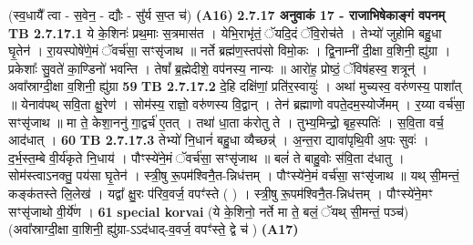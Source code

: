 \documentclass[17pt]{extarticle}
\begin{document}
{{                                    (स्व॒धायै᳚ त्वा - स॒वेन॒ - द्यौः - सु᳚र्य स॒प्त च॑) \textbf{(A16)} \newline \newline
                \textbf{ 2.7.17     अनुवाकं   17 - राजाभिषेकाङ्गं वपनम्} \newline
                                \textbf{ TB 2.7.17.1} \newline
                  ये के॒शिनः॑ प्रथ॒माः स॒त्रमास॑त । येभि॒राभृ॑तं॒ ॅयदि॒दं ॅवि॒रोच॑ते । तेभ्यो॑ जुहोमि बहु॒धा घृ॒तेन॑ । रा॒यस्पोषे॑णे॒मं ॅवर्च॑सा॒ सꣳसृ॑जाथ ॥ नर्ते ब्रह्म॑ण॒स्तप॑सो विमो॒कः । द्वि॒नाम्नी॑ दी॒क्षा व॒शिनी॒ ह्यु॑ग्रा । प्रकेशाः᳚ सु॒वते॑ का॒ण्डिनो॑ भवन्ति । तेषां᳚ ब्र॒ह्मेदीशे॒ वप॑नस्य॒ नान्यः ॥ आरो॑ह॒ प्रोष्ठं॒ ॅविष॑हस्व॒ शत्रून्॑ । अवा᳚स्राग्दी॒क्षा व॒शिनी॒ ह्यु॑ग्रा \textbf{ 59} \newline
                  \newline
                                \textbf{ TB 2.7.17.2} \newline
                  दे॒हि दक्षि॑णां॒ प्रति॑र॒स्वायुः॑ । अथा॑ मुच्यस्व॒ वरु॑णस्य॒ पाशा᳚त् ॥ येनाव॑पथ् सवि॒ता क्षु॒रेण॑ । सोम॑स्य॒ राज्ञो॒ वरु॑णस्य वि॒द्वान् । तेन॑ ब्रह्माणो वपते॒दम॒स्योर्जेमम् । र॒य्या वर्च॑सा॒ सꣳसृ॑जाथ ॥ मा ते॒ केशा॒ननु॑ गा॒द्वर्च॑ ए॒तत् । तथा॑ धा॒ता क॑रोतु ते । तुभ्य॒मिन्द्रो॒ बृह॒स्पतिः॑ । स॒वि॒ता वर्च॒ आद॑धात् । \textbf{ 60} \newline
                  \newline
                                \textbf{ TB 2.7.17.3} \newline
                  तेभ्यो॑ नि॒धानं॑ बहु॒धा व्यैच्छन्न्॑ । अ॒न्त॒रा द्यावा॑पृथि॒वी अ॒पः सुवः॑ । द॒र्भ॒स्त॒म्बे वी॒र्य॑कृते नि॒धाय॑ । पौꣳस्ये॑ने॒मं ॅवर्च॑सा॒ सꣳसृ॑जाथ ॥ बलं॑ ते बाहु॒वोः स॑वि॒ता द॑धातु । सोम॑स्त्वाऽनक्तु॒ पय॑सा घृ॒तेन॑ । स्त्री॒षु रू॒पम॑श्विनै॒त-न्निध॑त्तम् । पौꣳस्ये॑ने॒मं वर्च॑सा॒ सꣳसृ॑जाथ ॥ यथ् सी॒मन्तं॒ कङ्क॑तस्ते लि॒लेख॑ । यद्वा᳚ क्षु॒रः प॑रिव॒वर्ज॒ वपꣳ॑स्ते ( ) । स्त्री॒षु रू॒पम॑श्विनै॒त-न्निध॑त्तम् । पौꣳस्ये॑ने॒मꣳ सꣳसृ॑जाथो वी॒र्ये॑ण । \textbf{ 61} \newline
                  \newline
                                                        \textbf{special korvai} \newline
              (ये के॒शिनो॒ नर्ते मा ते॒ बलं॒ ॅयथ् सी॒मन्तं॒ पञ्च॑) \newline
                                (अवा᳚स्राग्दी॒क्षा वा॒शिनी॒ ह्यु॑ग्रा-ऽऽद॑धाद्-व॒वर्ज॒ वपꣳ॑स्ते॒ द्वे च॑ ) \textbf{(A17)} \newline \newline
}}
\end{document}
